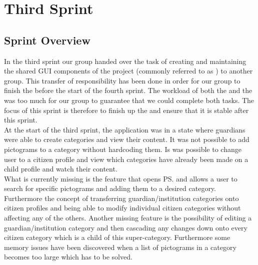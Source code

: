 \part{Third Sprint}
\label{par:third_sprint}

\chapter{Sprint Overview}
In the third sprint our group handed over the task of creating and maintaining the shared GUI components of the project (commonly referred to as \gc) to another group. This transfer of responsibility has been done in order for our group to finish the \ct before the start of the fourth sprint. The workload of both the \ct and the \gc was too much for our group to guarantee that we could complete both tasks. The focus of this sprint is therefore to finish up the \ct and ensure that it is stable after this sprint.\\

At the start of the third sprint, the application was in a state where guardians were able to create categories and view their content. It was not possible to add pictograms to a category without hardcoding them. Is was possible to change user to a citizen profile and view which categories have already been made on a child profile and watch their content. \\

What is currently missing is the feature that opens \ps and allows a user to search for specific pictograms and adding them to a desired category. Furthermore the concept of transferring guardian/institution categories onto citizen profiles and being able to modify individual citizen categories without affecting any of the others. Another missing feature is the possibility of editing a guardian/institution category and then cascading any changes down onto every citizen category which is a child of this super-category. Furthermore some memory issues have been discovered when a list of pictograms in a category becomes too large which has to be solved. 




